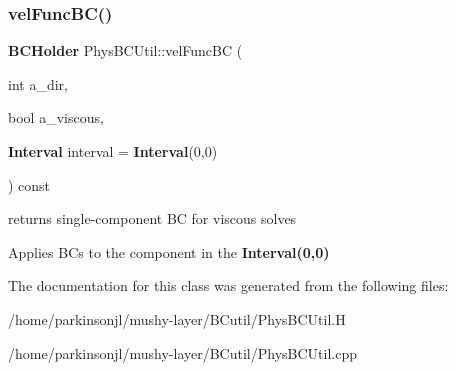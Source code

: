 \subsubsection{\texorpdfstring{vel\+Func\+B\+C()}{velFuncBC()}}
{\footnotesize\ttfamily \textbf{ B\+C\+Holder} Phys\+B\+C\+Util\+::vel\+Func\+BC (\begin{DoxyParamCaption}\item[{int}]{a\+\_\+dir,  }\item[{bool}]{a\+\_\+viscous,  }\item[{\textbf{ Interval}}]{interval = {\ttfamily \textbf{ Interval}(0,0)} }\end{DoxyParamCaption}) const\hspace{0.3cm}{\ttfamily [virtual]}}



returns single-\/component BC for viscous solves 

Applies B\+Cs to the component in the \textbf{ Interval(0,0)} 

The documentation for this class was generated from the following files\+:\begin{DoxyCompactItemize}
\item 
/home/parkinsonjl/mushy-\/layer/\+B\+Cutil/Phys\+B\+C\+Util.\+H\item 
/home/parkinsonjl/mushy-\/layer/\+B\+Cutil/Phys\+B\+C\+Util.\+cpp\end{DoxyCompactItemize}
